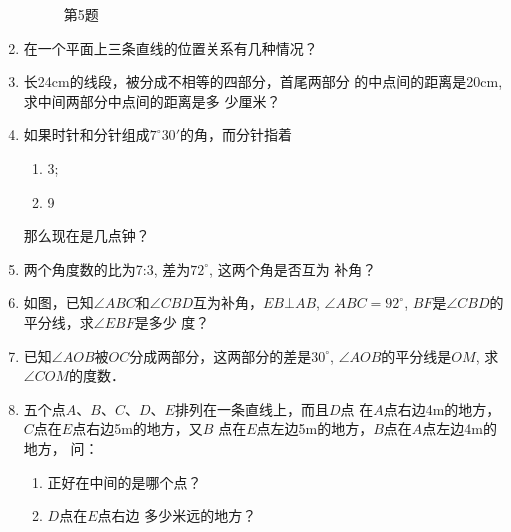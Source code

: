 \begin{enumerate}
\begin{figure}[htp]
\begin{minipage}[t]{0.48\textwidth}
\begin{tikzpicture}[>=latex, scale=1]
	\end{tikzpicture}
	\caption*{第5题}
	\end{minipage}
	\end{figure}

\item 在一个平面上三条直线的位置关系有几种情况？
\item 长24cm的线段，被分成不相等的四部分，首尾两部分
的中点间的距离是20cm, 求中间两部分中点间的距离是多
少厘米？
\item 如果时针和分针组成$7^{\circ}30'$的角，而分针指着
\begin{multicols}{2}
	\begin{enumerate}
		\item 3;
		\item 9
	\end{enumerate}
\end{multicols}
那么现在是几点钟？
\item 两个角度数的比为7:3, 差为$72^{\circ}$, 这两个角是否互为
补角？
\item 如图，已知$\angle ABC$和$\angle CBD$互为补角，$EB\bot AB$, $\angle ABC=92^{\circ}$, $BF$是$\angle CBD$的平分线，求$\angle EBF$是多少
度？
\item 已知$\angle AOB$被$OC$分成两部分，这两部分的差是$30^{\circ}$, 
$\angle AOB$的平分线是$OM$, 求$\angle COM$的度数．
\item 五个点$A$、$B$、$C$、$D$、$E$排列在一条直线上，而且$D$点
在$A$点右边4m的地方，$C$点在$E$点右边5m的地方，又$B$
点在$E$点左边5m的地方，$B$点在$A$点左边4m的地方，
问：
\begin{enumerate}
	\item 正好在中间的是哪个点？
	\item $D$点在$E$点右边
多少米远的地方？
\end{enumerate}


\end{enumerate}
